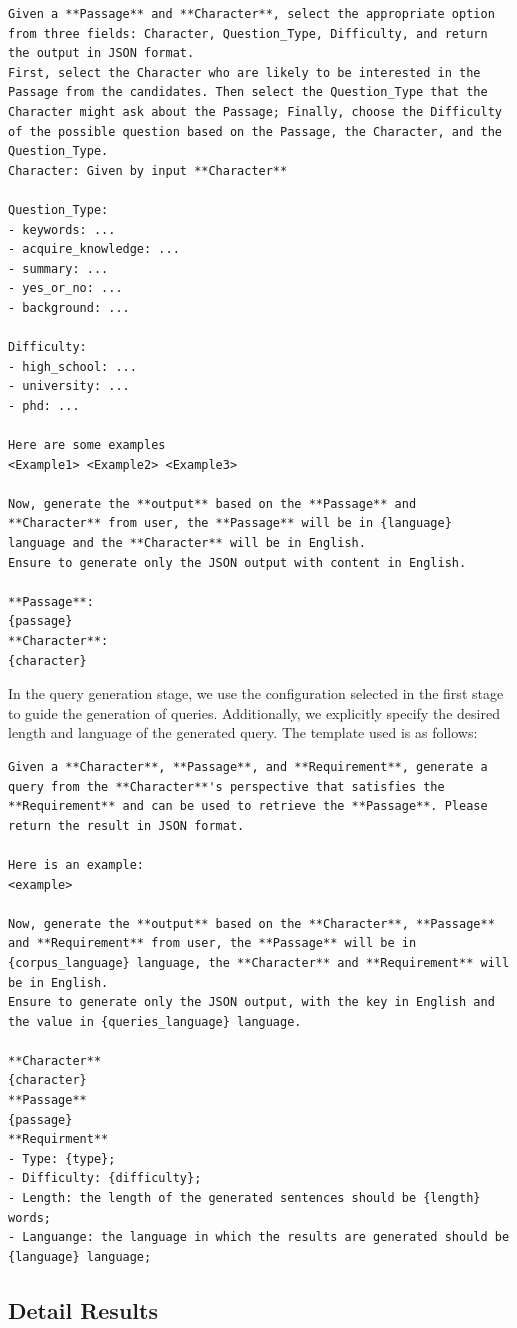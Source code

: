 \documentclass{article} %
\begin{document}
\begin{promptblock}
    \begin{verbatim}
Given a **Passage** and **Character**, select the appropriate option from three fields: Character, Question_Type, Difficulty, and return the output in JSON format.
First, select the Character who are likely to be interested in the Passage from the candidates. Then select the Question_Type that the Character might ask about the Passage; Finally, choose the Difficulty of the possible question based on the Passage, the Character, and the Question_Type.
Character: Given by input **Character**

Question_Type:
- keywords: ...
- acquire_knowledge: ...
- summary: ...
- yes_or_no: ...
- background: ...

Difficulty:
- high_school: ...
- university: ...
- phd: ...

Here are some examples
<Example1> <Example2> <Example3>

Now, generate the **output** based on the **Passage** and **Character** from user, the **Passage** will be in {language} language and the **Character** will be in English.
Ensure to generate only the JSON output with content in English.

**Passage**:
{passage}
**Character**:
{character}
\end{verbatim}
\end{promptblock}

In the query generation stage, we use the configuration selected in the first stage to guide the generation of queries. Additionally, we explicitly specify the desired length and language of the generated query. The template used is as follows:

\begin{promptblock}
    \begin{verbatim}
Given a **Character**, **Passage**, and **Requirement**, generate a query from the **Character**'s perspective that satisfies the **Requirement** and can be used to retrieve the **Passage**. Please return the result in JSON format.

Here is an example:
<example>

Now, generate the **output** based on the **Character**, **Passage** and **Requirement** from user, the **Passage** will be in {corpus_language} language, the **Character** and **Requirement** will be in English.
Ensure to generate only the JSON output, with the key in English and the value in {queries_language} language.

**Character**
{character}
**Passage**
{passage}
**Requirment**
- Type: {type};
- Difficulty: {difficulty};
- Length: the length of the generated sentences should be {length} words;
- Languange: the language in which the results are generated should be {language} language;
    \end{verbatim}
\end{promptblock}

 


\subsection{Detail Results}




\end{document}
